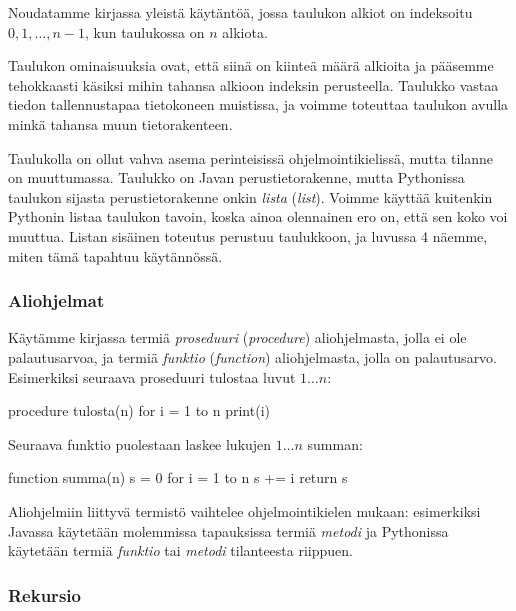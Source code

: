 Noudatamme kirjassa yleistä käytäntöä, jossa taulukon alkiot on indeksoitu
$0,1,\dots,n-1$, kun taulukossa on $n$ alkiota.

Taulukon ominaisuuksia ovat, että siinä on kiinteä määrä alkioita ja
pääsemme tehokkaasti käsiksi mihin tahansa alkioon indeksin perusteella.
Taulukko vastaa tiedon tallennustapaa tietokoneen muistissa,
ja voimme toteuttaa taulukon avulla minkä tahansa muun tietorakenteen.


Taulukolla on ollut vahva asema perinteisissä ohjelmointikielissä,
mutta tilanne on muuttumassa.
Taulukko on Javan perustietorakenne, mutta Pythonissa
taulukon sijasta perustietorakenne onkin \emph{lista} (\emph{list}).
Voimme käyttää kuitenkin Pythonin listaa taulukon tavoin,
koska ainoa olennainen ero on, että sen koko voi muuttua.
Listan sisäinen toteutus perustuu taulukkoon,
ja luvussa 4 näemme, miten tämä tapahtuu käytännössä.

\subsubsection{Aliohjelmat}


Käytämme kirjassa termiä \emph{proseduuri} (\emph{procedure})
aliohjelmasta, jolla ei ole palautusarvoa,
ja termiä \emph{funktio} (\emph{function}) aliohjelmasta, jolla on palautusarvo.
Esimerkiksi seuraava proseduuri tulostaa luvut $1 \dots n$:

\begin{code}
procedure tulosta(n)
    for i = 1 to n
        print(i)
\end{code}

Seuraava funktio puolestaan laskee lukujen $1 \dots n$ summan:

\begin{code}
function summa(n)
    s = 0
    for i = 1 to n
        s += i
    return s
\end{code}

Aliohjelmiin liittyvä termistö vaihtelee ohjelmointikielen mukaan:
esimerkiksi Javassa käytetään molemmissa tapauksissa termiä
\emph{metodi} ja Pythonissa käytetään termiä \emph{funktio} tai
\emph{metodi} tilanteesta riippuen.

\subsubsection{Rekursio}

